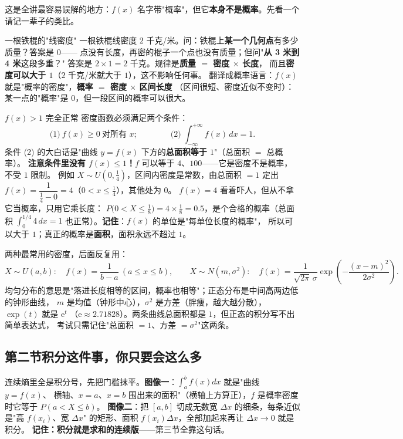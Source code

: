 这是全讲最容易误解的地方：$f(x)$ 名字带"概率"，但它\textbf{本身不是概率}。先看一个请记一辈子的类比。

\begin{idea}{一根铁棍的"线密度"}
一根铁棍线密度 $2$ 千克/米。问：铁棍上\textbf{某一个几何点}有多少质量？答案是 $0$——
点没有长度，再密的棍子一个点也没有质量；但问"\textbf{从 3 米到 4 米}这段多重？"
答案是 $2\times1=2$ 千克。规律是\textbf{质量 $=$ 密度 $\times$ 长度}，
而且\textbf{密度可以大于 $1$}（$2$ 千克/米就大于 $1$），这不影响任何事。
翻译成概率语言：$f(x)$ 就是"概率的密度"，\textbf{概率 $=$ 密度 $\times$ 区间长度}
（区间很短、密度近似不变时）：某一点的"概率"是 $0$，但一段区间的概率可以很大。
\end{idea}

\begin{calc}{$f(x)>1$ 完全正常}
密度函数必须满足两个条件：
\[
\text{(1)}\ f(x)\ge0\ \text{对所有 }x ;
\qquad\qquad
\text{(2)}\ \int_{-\infty}^{+\infty}f(x)\,dx=1 .
\]
条件 (2) 的大白话是"曲线 $y=f(x)$ 下方的\textbf{总面积等于 $1$}"（总面积 $=$ 总概率）。
\textbf{注意条件里没有 $f(x)\le1$！}$f$ 可以等于 $4$、$100$——它是密度不是概率，不受 $1$ 限制。
例如 $X\sim U(0,\tfrac14)$，区间内密度是常数，由总面积 $=1$ 定出
$f(x)=\dfrac{1}{\tfrac14-0}=4$（$0<x\le\tfrac14$），其他处为 $0$。
$f(x)=4$ 看着吓人，但从不拿它当概率，只用它乘长度：
$P\bigl(0<X\le\tfrac18\bigr)=4\times\tfrac18=0.5$，是个合格的概率（总面积
$\int_0^{1/4}4\,dx=1$ 也正常）。\textbf{记住}：$f(x)$ 的单位是"每单位长度的概率"，
所以可以大于 $1$；真正的概率是\textbf{面积}，面积永远不超过 $1$。
\end{calc}

两种最常用的密度，后面反复用：
\[
X\sim U(a,b):\quad f(x)=\frac{1}{b-a}\ (a\le x\le b),\qquad
X\sim N(m,\sigma^2):\quad f(x)=\frac{1}{\sqrt{2\pi}\,\sigma}\exp\!\left(-\frac{(x-m)^2}{2\sigma^2}\right).
\]
均匀分布的意思是"落进长度相等的区间，概率也相等"；正态分布是中间高两边低的钟形曲线，
$m$ 是均值（钟形中心），$\sigma^2$ 是方差（胖瘦，越大越分散），$\exp(t)$ 就是 $\mathrm{e}^t$
（$\mathrm{e}\approx2.71828$）。两条曲线总面积都是 $1$，但正态的积分写不出简单表达式，
考试只需记住"总面积 $=1$、方差 $=\sigma^2$"这两条。

\subsection{第二节\quad 积分这件事，你只要会这么多}

连续熵里全是积分号，先把门槛抹平。\textbf{图像一}：$\int_a^b f(x)dx$ 就是"曲线 $y=f(x)$、
横轴、$x=a$、$x=b$ 围出来的面积"（横轴上方算正），$f$ 是概率密度时它等于 $P(a<X\le b)$。
\textbf{图像二}：把 $[a,b]$ 切成无数宽 $\Delta x$ 的细条，每条近似是"高 $f(x_i)$、宽 $\Delta x$"
的矩形、面积 $f(x_i)\Delta x$，全部加起来再让 $\Delta x\to0$ 就是积分。
\textbf{记住：积分就是求和的连续版}——第三节全靠这句话。

